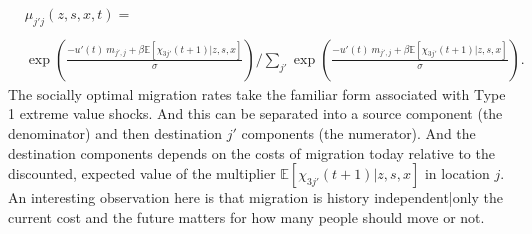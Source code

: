 \documentclass[12pt,pdftex]{article}
\begin{document}
\begin{onehalfspacing}
{\small
\begin{align}
& \mu_{j'j}(z,s,x,t) =  \nonumber \\
\nonumber \\
&\exp \left(\frac{- u'(t) \ m_{j',j} + \beta\mathbb{E}\left[\chi_{3j'}(t+1)| z, s,x \right]}{\sigma} \right)  \Bigg / \sum_{j'} \exp \left( \frac{-u'(t)\ m_{j',j} + \beta\mathbb{E}\left[\chi_{3j'}(t+1)| z,s,x \right]}{\sigma} \right).
\end{align}}The socially optimal migration rates take the familiar form associated with Type 1 extreme value shocks. And this can be separated into a source component (the denominator) and then destination $j'$ components (the numerator). And the destination components depends on the costs of migration today relative to the discounted, expected value of the multiplier $\mathbb{E}\left[\chi_{3j'}(t+1)|z, s,x \right]$ in location $j$. An interesting observation here is that migration is history independent|only the current cost and the future matters for how many people should move or not.


\end{onehalfspacing}
\end{document}
